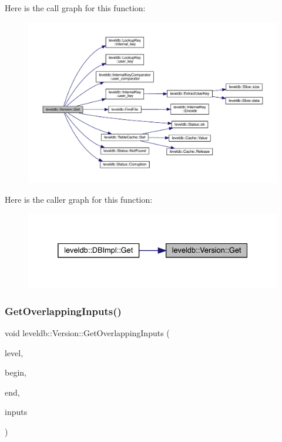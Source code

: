 Here is the call graph for this function\+:
\nopagebreak
\begin{figure}[H]
\begin{center}
\leavevmode
\includegraphics[width=350pt]{classleveldb_1_1_version_a42c439d4a2a767fe281c7a75d4255038_cgraph}
\end{center}
\end{figure}
Here is the caller graph for this function\+:
\nopagebreak
\begin{figure}[H]
\begin{center}
\leavevmode
\includegraphics[width=332pt]{classleveldb_1_1_version_a42c439d4a2a767fe281c7a75d4255038_icgraph}
\end{center}
\end{figure}
\mbox{\label{classleveldb_1_1_version_afd86dffba7ce5229778bddd546517392}} 
\subsubsection{\texorpdfstring{GetOverlappingInputs()}{GetOverlappingInputs()}}
{\footnotesize\ttfamily void leveldb\+::\+Version\+::\+Get\+Overlapping\+Inputs (\begin{DoxyParamCaption}\item[{int}]{level,  }\item[{const \mbox{\hyperlink{classleveldb_1_1_internal_key}{Internal\+Key}} $\ast$}]{begin,  }\item[{const \mbox{\hyperlink{classleveldb_1_1_internal_key}{Internal\+Key}} $\ast$}]{end,  }\item[{std\+::vector$<$ \mbox{\hyperlink{structleveldb_1_1_file_meta_data}{File\+Meta\+Data}} $\ast$ $>$ $\ast$}]{inputs }\end{DoxyParamCaption})}

